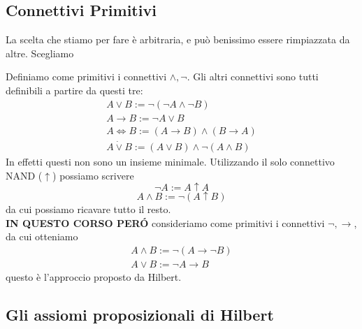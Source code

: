 \documentclass[11pt]{scrartcl}
\begin{document}
	\subsection{Connettivi Primitivi}
	La scelta che stiamo per fare è arbitraria, e può benissimo essere rimpiazzata da altre. Scegliamo 
	\begin{definition}
		Definiamo come primitivi i connettivi $\land,\lnot$. Gli altri connettivi sono tutti definibili a partire da questi tre:
		\begin{gather*}
			A\lor B := \lnot \left(\lnot A \land \lnot B\right) \\
			A \to B := \lnot A \lor B \\
			A \iff B := \left(A \to B\right) \land \left(B \to A\right) \\
			A \dot{\lor} B := (A\lor B) \land \lnot\left(A\land B\right)
		\end{gather*}
		In effetti questi non sono un insieme minimale. Utilizzando il solo connettivo NAND ($\uparrow$) possiamo scrivere
		$$\lnot A:= A\uparrow A$$
		$$A\land B:=\lnot (A\uparrow B)$$
		da cui possiamo ricavare tutto il resto. \\
		\textbf{IN QUESTO CORSO PER\'O} consideriamo come primitivi i connettivi $\lnot, \to$, da cui otteniamo
		\begin{gather}
			A \land B := \lnot \left(A\to \lnot B\right) \\
			A \lor B  := \lnot A \to B
		\end{gather}
		questo è l'approccio proposto da Hilbert.
	\end{definition}
	
	\subsection{Gli assiomi proposizionali di Hilbert}
	
\end{document}
